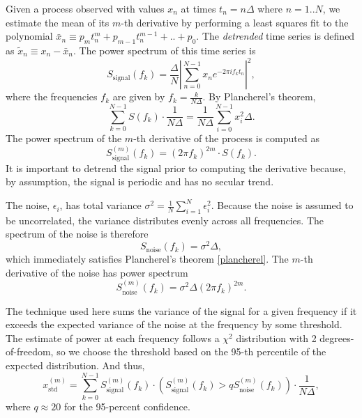 \documentclass{ametsoc}
\begin{document}
Given a process observed with values $x_n$ at times $t_n = n \Delta$ where $n=1..N$, we estimate the mean of its $m$-th derivative by performing a least squares fit to the polynomial $\bar{x}_n \equiv p_m t_n^m + p_{m-1} t_n^{m-1} + .. + p_0$. The \emph{detrended} time series is defined as $\tilde{x}_n \equiv x_n - \bar{x}_n$. The power spectrum of this time series is
\begin{equation}
S_{\textrm{signal}}(f_k) = \frac{\Delta}{N} \left\lvert \sum_{n=0}^{N-1} x_n e^{-2\pi i f_k t_n} \right\rvert^2,
\end{equation}
where the frequencies $f_k$ are given by $f_k = \frac{k}{N\Delta}$. %
By Plancherel's theorem,
\begin{equation}
\label{plancherel}
\sum_{k=0}^{N-1} S(f_k) \cdot \frac{1}{N \Delta} = \frac{1}{N \Delta} \sum_{i=0}^{N-1} x_i^2 \Delta.
\end{equation}
The power spectrum of the $m$-th derivative of the process is computed as
\begin{equation}
S_{\textrm{signal}}^{(m)}(f_k) = (2 \pi f_k)^{2m} \cdot S(f_k).
\end{equation}
It is important to detrend the signal prior to computing the derivative because, by assumption, the signal is periodic and has no secular trend.

The noise, $\epsilon_i$, has total variance $\sigma^2 = \frac{1}{N} \sum_{i=1}^{N} \epsilon_i^2$. Because the noise is assumed to be uncorrelated, the variance distributes evenly across all frequencies. The spectrum of the noise is therefore
\begin{equation}
S_{\textrm{noise}}(f_k) = \sigma^2 \Delta,
\end{equation}
which immediately satisfies Plancherel's theorem \eqref{plancherel}. The $m$-th derivative of the noise has power spectrum
\begin{equation}
S_{\textrm{noise}}^{(m)}(f_k) = \sigma^2 \Delta (2 \pi f_k)^{2m}.
\end{equation}

The technique used here sums the variance of the signal for a given frequency if it exceeds the expected variance of the noise at the frequency by some threshold. The estimate of power at each frequency follows a $\chi^2$ distribution with 2 degrees-of-freedom, so we choose the threshold based on the 95-th percentile of the expected distribution. And thus,
\begin{equation}
x^{(m)}_{\textrm{std}} = \sum_{k=0}^{N-1} S^{(m)}_{\textrm{signal}}(f_k) \cdot \left( S^{(m)}_{\textrm{signal}}(f_k) > q S_{\textrm{noise}}^{(m)}(f_k) \right) \cdot \frac{1}{N \Delta},
\end{equation}
where $q\approx 20$ for the 95-percent confidence.





\end{document}

